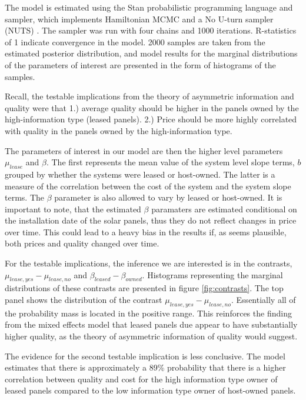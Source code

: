 \documentclass[12pt]{article}
\begin{document}
The model is estimated using the Stan probabilistic programming language and sampler, which implements Hamiltonian MCMC and a No U-turn sampler (NUTS) \citep{stan_development_team_stan_2014}. The sampler was run with four chains and 1000 iterations. R-statistics of 1 indicate convergence in the model. 2000 samples are taken from the estimated posterior distribution, and model results for the marginal distributions of the parameters of interest are presented in the form of histograms of the samples.

Recall, the testable implications from the theory of asymmetric information and quality were that 1.) average quality should be higher in the panels owned by the high-information type (leased panels). 2.) Price should be more highly correlated with quality in the panels owned by the high-information type.

The parameters of interest in our model are then the higher level parameters $\mu_{lease}$ and $\beta$. The first represents the mean value of the system level slope terms, $b$ grouped by whether the systems were leased or host-owned. The latter is a measure of the correlation between the cost of the system and the system slope terms. The $\beta$ parameter is also allowed to vary by leased or host-owned. It is important to note, that the estimated $\beta$ paramaters are estimated conditional on the installation date of the solar panels, thus they do not reflect changes in price over time. This could lead to a heavy bias in the results if, as seems plausible, both prices and quality changed over time.

For the testable implications, the inference we are interested is in the contrasts, $\mu_{lease, yes} - \mu_{lease, no}$ and $\beta_{leased}- \beta_{owned}$. Histograms representing the marginal distributions of these contrasts are presented in figure \ref{fig:contrasts}. The top panel shows the distribution of the contrast $\mu_{lease, yes} - \mu_{lease, no}$. Essentially all of the probability mass is located in the positive range. This reinforces the finding from the mixed effects model that leased panels due appear to have substantially higher quality, as the theory of asymmetric information of quality would suggest.

The evidence for the second testable implication is less conclusive. The model estimates that there is approximately a 89\% probability that there is a higher correlation between quality and cost for the high information type owner of leased panels compared to the low information type owner of host-owned panels.
\end{document}
